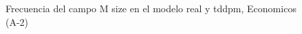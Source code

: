 \begin{figure}[H]
    \centering
    
    \caption{Frecuencia del campo M size en el modelo real y tddpm, Economicos (A-2)}
    \label{frecuency-M Size-tddpm_mlp}
\end{figure}